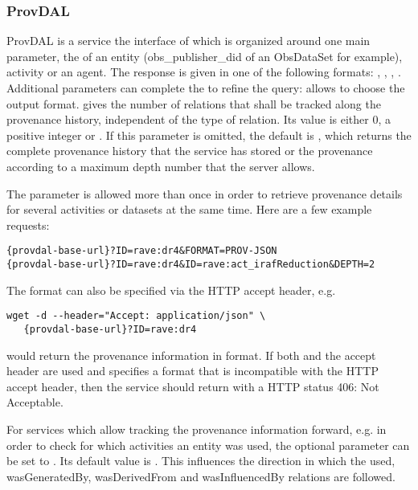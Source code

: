 \subsubsection{ProvDAL}
ProvDAL is a service the interface of which is organized around one main parameter, the  of an entity (obs\_publisher\_did of an ObsDataSet for example), activity or an agent.
The response is given in one of the following formats: , , , .
Additional parameters can complete the  to refine the query:  allows to choose the output format.  gives the number of relations that shall be tracked along the provenance history, independent of the type of relation. Its value is either 0, a positive integer or . If this parameter is omitted, the default is , which returns the complete provenance history that the service has stored or the provenance according to a maximum depth number that the server allows.

The  parameter is allowed more than once in order to retrieve provenance details for several activities or datasets at the same time. Here are a few example requests:

\begin{verbatim}
{provdal-base-url}?ID=rave:dr4&FORMAT=PROV-JSON
{provdal-base-url}?ID=rave:dr4&ID=rave:act_irafReduction&DEPTH=2
\end{verbatim}

\noindent
The format can also be specified via the HTTP accept header, e.g.
\begin{verbatim}
wget -d --header="Accept: application/json" \
   {provdal-base-url}?ID=rave:dr4
\end{verbatim}
would return the provenance information in  format.
\noindent
If both  and the accept header are used and  specifies a format that is incompatible with the HTTP accept header, then the service should return with a HTTP status 406: Not Acceptable.

For services which allow tracking the provenance information forward, e.g. in order to check for which activities an entity was used, the optional parameter  can be set to . Its default value is . This influences the direction in which the used, wasGeneratedBy, wasDerivedFrom and wasInfluencedBy relations are followed.

